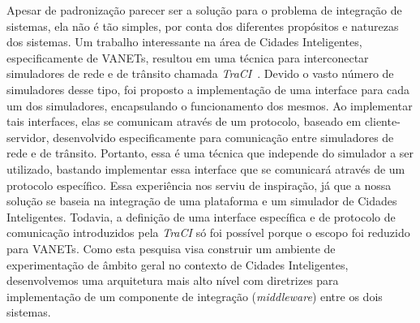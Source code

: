 Apesar de padronização parecer ser a solução para o problema de integração de sistemas, ela não é tão simples, por conta dos diferentes propósitos e naturezas dos sistemas.
Um trabalho interessante na área de Cidades Inteligentes, especificamente de VANETs, resultou em uma técnica para interconectar simuladores de rede e de trânsito chamada \textit{TraCI}~\cite{wegener_2008}.
Devido o vasto número de simuladores desse tipo, foi proposto a implementação de uma interface para cada um dos simuladores, encapsulando o funcionamento dos mesmos.
Ao implementar tais interfaces, elas se comunicam através de um protocolo, baseado em cliente-servidor, desenvolvido especificamente para comunicação entre simuladores de rede e de trânsito.
Portanto, essa é uma técnica que independe do simulador a ser utilizado, bastando implementar essa interface que se comunicará através de um protocolo específico.
Essa experiência nos serviu de inspiração, já que a nossa solução se baseia na integração de uma plataforma e um simulador de Cidades Inteligentes.
Todavia, a definição de uma interface específica e de protocolo de comunicação introduzidos pela \textit{TraCI} só foi possível porque o escopo foi reduzido para VANETs.
Como esta pesquisa visa construir um ambiente de experimentação de âmbito geral no contexto de Cidades Inteligentes, desenvolvemos uma arquitetura mais alto nível com diretrizes para implementação de um
componente de integração (\textit{middleware}) entre os dois sistemas.
